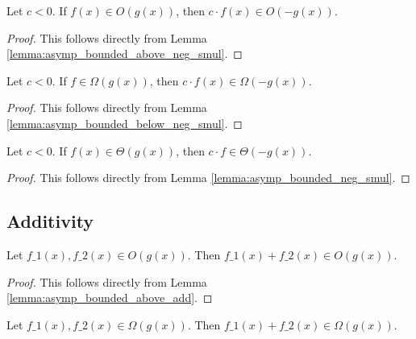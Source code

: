 \begin{lemma}
    \label{lemma:O_neg_smul}
    \leanok
    Let $c < 0$. If $f(x) \in O(g(x))$, then $c \cdot f(x) \in O(-g(x))$.
\end{lemma}

\begin{proof}
    \leanok
    This follows directly from Lemma \ref{lemma:asymp_bounded_above_neg_smul}.
\end{proof}

\begin{lemma}
    \label{lemma:Omega_neg_smul}
    \leanok
    Let $c < 0$. If $f \in \Omega(g(x))$, then $c \cdot f(x) \in \Omega(-g(x))$.
\end{lemma}

\begin{proof}
    \leanok
    This follows directly from Lemma \ref{lemma:asymp_bounded_below_neg_smul}.
\end{proof}

\begin{lemma}
    \label{lemma:theta_neg_smul}
    \leanok
    Let $c < 0$. If $f(x) \in \Theta(g(x))$, then $c \cdot f \in \Theta(-g(x))$.
\end{lemma}

\begin{proof}
    \leanok
    This follows directly from Lemma \ref{lemma:asymp_bounded_neg_smul}.
\end{proof}


\subsection{Additivity}

\begin{lemma}
    \label{lemma:O_add}
    \leanok
    Let $f\_1(x), f\_2(x) \in O(g(x))$. Then $f\_1(x) + f\_2(x) \in O(g(x))$.
\end{lemma}

\begin{proof}
    \leanok
    This follows directly from Lemma \ref{lemma:asymp_bounded_above_add}.
\end{proof}

\begin{lemma}
    \label{lemma:Omega_add}
    \leanok
    Let $f\_1(x), f\_2(x) \in \Omega(g(x))$. Then $f\_1(x) + f\_2(x) \in \Omega(g(x))$.
\end{lemma}

